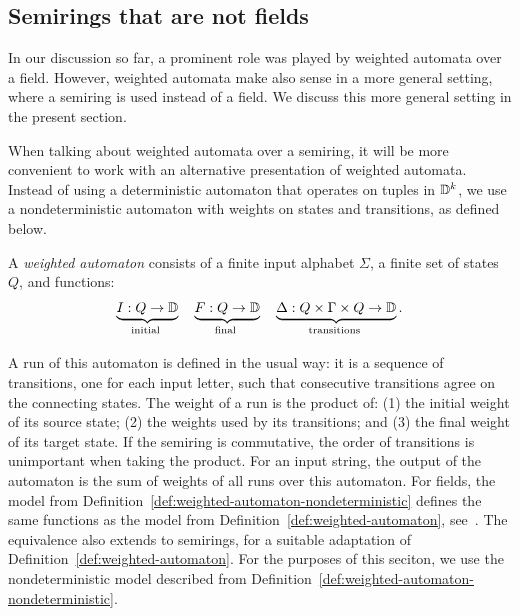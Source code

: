 
\subsection{Semirings that are not fields}
\label{sec:beyond-fields}
In our discussion so far, a prominent role was played by weighted automata over a field. However, weighted automata make also sense in a more general setting, where a semiring is used instead of a field. We discuss this more general setting in the present section.

When talking about weighted automata over a semiring, it  will be more convenient to work with an alternative presentation of weighted automata.  Instead of using a deterministic automaton that operates on tuples in $\mathbb D^k$, we use a nondeterministic automaton with weights on states and transitions, as defined below. 
\begin{definition}
    \label{def:weighted-automaton-nondeterministic}
    A \emph{weighted automaton} consists of a finite input alphabet $\Sigma$,  a finite set of states $Q$, and functions: 
    \begin{align*}
    \myunderbrace{I : Q \to \domain}{initial}
    \quad
    \myunderbrace{F : Q \to \domain}{final}
    \quad
    \myunderbrace{\Delta : Q \times \Gamma \times Q \to \domain}{transitions}.
    \end{align*}
\end{definition}
 A run of this automaton is defined in the usual way: it is a sequence of transitions, one for each input letter, such that consecutive transitions agree on the connecting states. The weight of a run is the product of: (1) the initial weight of its source state; (2) the weights used by its transitions; and (3) the final weight of its target state. If the semiring is commutative, the order of transitions is unimportant when taking the product. For an input string, the output of the automaton is the sum of weights of all runs over this automaton.  For fields, the model from Definition~\ref{def:weighted-automaton-nondeterministic}  defines the same functions as the model from Definition~\ref{def:weighted-automaton}, see~\cite[Lemma 8.3]{bojanczyk_automata_2025}. The equivalence also extends to semirings, for a suitable adaptation of Definition~\ref{def:weighted-automaton}. For the purposes of this seciton, we use the nondeterministic  model described from Definition~\ref{def:weighted-automaton-nondeterministic}.



